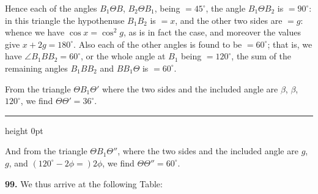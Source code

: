 \documentclass[11pt,a4paper]{article}
\newcommand{\artno}[1]{\textbf{#1.}\quad}
\begin{document}
Hence each of the angles $B_{1}\Theta B$, $B_{2}\Theta B_{1}$, being
$=45^{\circ}$, the angle $B_{1}\Theta B_{2}$ is $=90^{\circ}$: in this
triangle the hypothenuse $B_{1}B_{2}$ is $=x$, and the other two sides are
$=g$: whence we have $\cos x = \cos^{2}\!g$, as is in fact the case, and
moreover the values give $x + 2g = 180^{\circ}$. Also each of the other
angles is found to be $=60^{\circ}$; that is, we have
$\angle B_{1}B B_{2} = 60^{\circ}$, or the whole angle at $B_{1}$ being
$=120^{\circ}$, the sum of the remaining angles $B_{1}B B_{2}$ and
$B B_{1}\Theta$ is $=60^{\circ}$.

From the triangle $\Theta B_{1}\Theta'$ where the two sides and the included
angle are $\beta$, $\beta$, $120^{\circ}$, we find $\Theta\Theta' = 36^{\circ}$.

\bigskip
\hrule height 0pt
\bigskip

\noindent
And from the triangle $\Theta B_{1}\Theta''$, where the two sides and the
included angle are $g$, $g$, and $(120^{\circ} - 2\phi =) 2\phi$, we find
$\Theta\Theta'' = 60^{\circ}$.

\artno{99} We thus arrive at the following Table:
\end{document}

